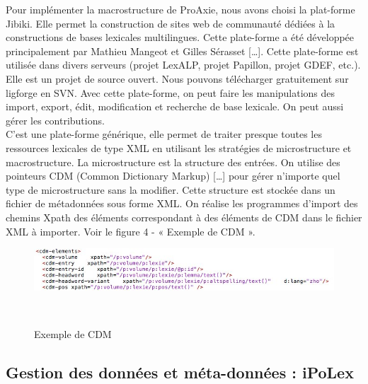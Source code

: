 \documentclass[10pt,a4paper,twoside]{article}
\begin{document}
\begin{itemize}
\cite{MMCE11}
Pour implémenter la macrostructure de ProAxie, nous avons choisi la plat-forme Jibiki. Elle permet la construction de sites web de communauté dédiées à la constructions de bases lexicales multilingues. Cette plate-forme a été développée principalement par Mathieu Mangeot et Gilles Sérasset […]. Cette plate-forme est utilisée dans divers serveurs (projet LexALP, projet Papillon, projet GDEF, etc.). Elle est un projet de source ouvert. Nous pouvons télécharger gratuitement sur ligforge en SVN. Avec cette plate-forme, on peut faire les manipulations des import, export, édit, modification et recherche de base lexicale. On peut aussi gérer les contributions. \\
C’est une plate-forme générique, elle permet de traiter presque toutes les ressources lexicales de type XML en utilisant les stratégies de microstructure et macrostructure. La microstructure est la structure des entrées. On utilise des pointeurs CDM (Common Dictionary Markup) […] pour gérer n’importe quel type de microstructure sans la modifier. Cette structure est stockée dans un fichier de métadonnées sous forme XML. On réalise les programmes d’import des chemins Xpath des éléments correspondant à des éléments de CDM dans le fichier XML à importer. Voir le figure 4 - « Exemple de CDM ». \\
\begin{figure}[htbp] 
\begin{center} 
\includegraphics[width=14cm]{images/CDM.jpg}
\end{center} 
\caption{Exemple de CDM} \label{image} \
\end{figure}



\cite{MMAC06}

\subsection{Gestion des données et méta-données : iPoLex}


\end{itemize}
\end{document}
